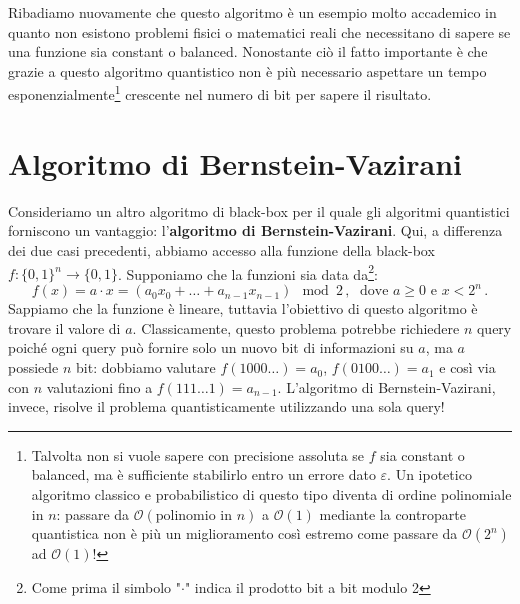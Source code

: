 \noindent Ribadiamo nuovamente che questo algoritmo è un esempio molto accademico in quanto non esistono problemi fisici o matematici reali che necessitano di sapere se una funzione sia constant o balanced. Nonostante ciò il fatto importante è che grazie a questo algoritmo quantistico non è più necessario aspettare un tempo esponenzialmente\footnote{Talvolta non si vuole sapere con precisione assoluta se $f$ sia constant o balanced, ma è sufficiente stabilirlo entro un errore dato $\varepsilon$. Un ipotetico algoritmo classico e probabilistico di questo tipo diventa di ordine polinomiale in $n$: passare da $\mathcal{O}(\text{polinomio in }n)$ a $\mathcal{O}(1)$ mediante la controparte quantistica non è più un miglioramento così estremo come passare da $\mathcal{O}(2^n)$ ad $\mathcal{O}(1)$!} crescente nel numero di bit per sapere il risultato. 

\section{Algoritmo di Bernstein-Vazirani}
Consideriamo un altro algoritmo di black-box per il quale gli algoritmi quantistici forniscono un vantaggio: l'\textbf{algoritmo di Bernstein-Vazirani}. Qui, a differenza dei due casi precedenti, abbiamo accesso alla funzione della black-box $f: \{0, 1\}^n \rightarrow \{0, 1\}$. Supponiamo che la funzioni sia data da\footnote{Come prima il simbolo "$\cdot$" indica il prodotto bit a bit modulo 2}:
\begin{equation*}
    f(x) = a\cdot x = (a_0 x_0 + \ldots + a_{n-1} x_{n-1})\mod{2} \, , \; \text{ dove } a \geq 0 \text{ e } x < 2^n \, .
\end{equation*}
Sappiamo che la funzione è lineare, tuttavia l'obiettivo di questo algoritmo è trovare il valore di $a$. Classicamente, questo problema potrebbe richiedere $n$ query poiché ogni query può fornire solo un nuovo bit di informazioni su $a$, ma $a$ possiede $n$ bit: dobbiamo valutare $f(1000\ldots) = a_0$, $f(0100\ldots) = a_1$ e così via con $n$ valutazioni fino a $f(111\ldots1) = a_{n-1}$. L'algoritmo di Bernstein-Vazirani, invece, risolve il problema quantisticamente utilizzando una sola query!

